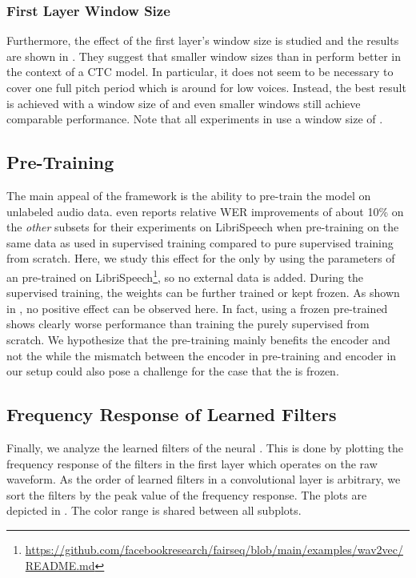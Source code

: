 \documentclass{INTERSPEECH2023}
\begin{document}
\subsubsection{First Layer Window Size}
\label{sec:scf_first_window}
Furthermore, the effect of the first layer's window size is studied and the results are shown in .
They suggest that smaller window sizes than in \cite{tuske2018:waveform} perform better in the context of a \conformer \gls{CTC} model.
In particular, it does not seem to be necessary to cover one full pitch period which is around  for low voices.
Instead, the best result is achieved with a window size of  and even smaller windows still achieve comparable performance.
Note that all experiments in  use a window size of .


\subsection{\wvtwo Pre-Training}

The main appeal of the \wvtwo framework is the ability to pre-train the model on unlabeled audio data.
\cite{facebook2020wav2vec2} even reports relative \gls{WER} improvements of about 10\% on the \textit{other} subsets for their experiments on LibriSpeech when pre-training on the same data as used in supervised training compared to pure supervised training from scratch.
Here, we study this effect for the \fe only by using the parameters of an \fe pre-trained on LibriSpeech\footnote{\raggedright\url{https://github.com/facebookresearch/fairseq/blob/main/examples/wav2vec/README.md}}, so no external data is added.
During the supervised training, the \fe weights can be further trained or kept frozen.
As shown in , no positive effect can be observed here.
In fact, using a frozen pre-trained \fe shows clearly worse performance than training the \fe purely supervised from scratch.
We hypothesize that the pre-training mainly benefits the \transformer encoder and not the \fe while the mismatch between the \transformer encoder in pre-training and \conformer encoder in our setup could also pose a challenge for the case that the \fe is frozen.


\subsection{Frequency Response of Learned Filters}
Finally, we analyze the learned filters of the neural \fes.
This is done by plotting the frequency response of the filters in the first layer which operates on the raw waveform.
As the order of learned filters in a convolutional layer is arbitrary, we sort the filters by the peak value of the frequency response.
The plots are depicted in .
The color range is shared between all subplots.
\end{document}
